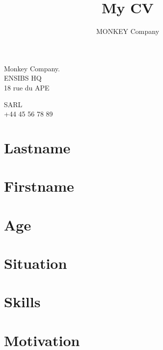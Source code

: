 \documentclass[10pt]{article}
\title{\bfseries\Huge My CV}
\author{MONKEY Company}
\date{}
\begin{document}
\maketitle
\vspace{1em}
\begin{minipage}[ht]{0.48\textwidth}
Monkey Company.\\
ENSIBS HQ \\
18 rue du APE
\end{minipage}
\begin{minipage}[ht]{0.48\textwidth}
SARL\\
+44 45 56 78 89
\end{minipage}
\vspace{20pt}
 
\section*{Lastname}


\section*{Firstname}


\section*{Age}


\section*{Situation}


\section*{Skills}


\section*{Motivation}

 
\end{document}
